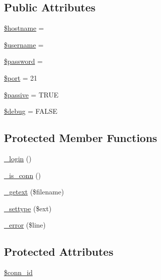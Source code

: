 \subsection*{Public Attributes}
\begin{DoxyCompactItemize}
\item 
\mbox{\hyperlink{class_c_i___f_t_p_a8bf9ffb42ed554b203b55377d1fc9aa4}{\$hostname}} = \textquotesingle{}\textquotesingle{}
\item 
\mbox{\hyperlink{class_c_i___f_t_p_a0eb82aa5f81cf845de4b36cd653c42cf}{\$username}} = \textquotesingle{}\textquotesingle{}
\item 
\mbox{\hyperlink{class_c_i___f_t_p_a607686ef9f99ea7c42f4f3dd3dbb2b0d}{\$password}} = \textquotesingle{}\textquotesingle{}
\item 
\mbox{\hyperlink{class_c_i___f_t_p_aa0787efab4b22e8a212882f3409d4c77}{\$port}} = 21
\item 
\mbox{\hyperlink{class_c_i___f_t_p_a9fb61732ea9189fa2be5574ad3576d9c}{\$passive}} = T\+R\+UE
\item 
\mbox{\hyperlink{class_c_i___f_t_p_a85ae3e64cd40e9564adceb010085e9dd}{\$debug}} = F\+A\+L\+SE
\end{DoxyCompactItemize}
\subsection*{Protected Member Functions}
\begin{DoxyCompactItemize}
\item 
\mbox{\hyperlink{class_c_i___f_t_p_a95562e7b8a41561f4b0b525d9c7fe701}{\+\_\+login}} ()
\item 
\mbox{\hyperlink{class_c_i___f_t_p_af20c08e4b61fe028e032b388cd73936a}{\+\_\+is\+\_\+conn}} ()
\item 
\mbox{\hyperlink{class_c_i___f_t_p_ab06ef33f96f03cafbb8f2bb6d695ef1f}{\+\_\+getext}} (\$filename)
\item 
\mbox{\hyperlink{class_c_i___f_t_p_aacd9d6628615078d8df9aab1fe70e391}{\+\_\+settype}} (\$ext)
\item 
\mbox{\hyperlink{class_c_i___f_t_p_ac618e7d56614851d2c54aa096e1bcace}{\+\_\+error}} (\$line)
\end{DoxyCompactItemize}
\subsection*{Protected Attributes}
\begin{DoxyCompactItemize}
\item 
\mbox{\hyperlink{class_c_i___f_t_p_a16c23f1dcbfed2f2759f5e54f604106d}{\$conn\+\_\+id}}
\end{DoxyCompactItemize}


